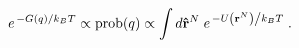 \documentclass{minimal}
\newcommand{\rn}{\mathbf{r}^N}
\newcommand{\rnhat}{\mathbf{\hat{r}}^N}
\newcommand{\rn}[1]{\mathrm{r}^N_{#1}}
\begin{document}
\begin{equation}
e^{ \left. -G(q) \right/ k_B T} \propto
  \mathrm{prob} (q) \propto
  \int d\rnhat \; e^{ \left. -U \left(\rn \right) \right/ k_B T} 
   \; .
\label{gofq}
\end{equation}
\end{document}
